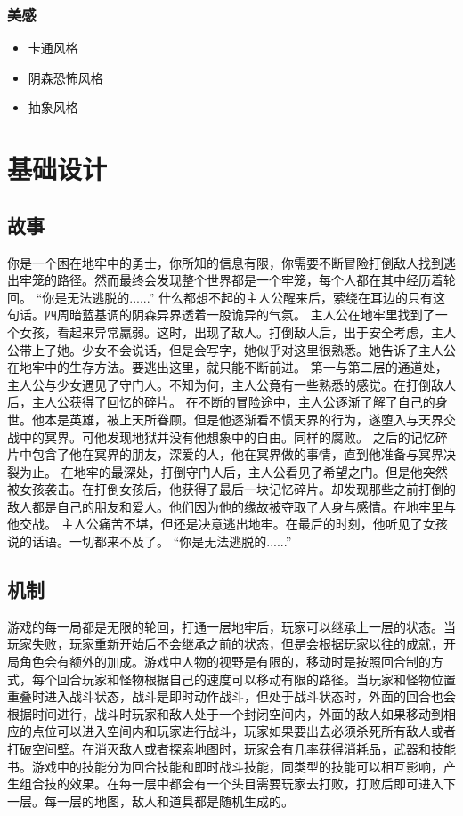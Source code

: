 \documentclass{article}
\begin{document}
\subsubsection{美感}
\begin{itemize}
	\item 卡通风格
	\item 阴森恐怖风格
	\item 抽象风格
\end{itemize}

\section{基础设计}
\subsection{故事}
你是一个困在地牢中的勇士，你所知的信息有限，你需要不断冒险打倒敌人找到逃出牢笼的路径。然而最终会发现整个世界都是一个牢笼，每个人都在其中经历着轮回。
“你是无法逃脱的......”
什么都想不起的主人公醒来后，萦绕在耳边的只有这句话。四周暗蓝基调的阴森异界透着一股诡异的气氛。
主人公在地牢里找到了一个女孩，看起来异常羸弱。这时，出现了敌人。打倒敌人后，出于安全考虑，主人公带上了她。少女不会说话，但是会写字，她似乎对这里很熟悉。她告诉了主人公在地牢中的生存方法。要逃出这里，就只能不断前进。
第一与第二层的通道处，主人公与少女遇见了守门人。不知为何，主人公竟有一些熟悉的感觉。在打倒敌人后，主人公获得了回忆的碎片。
在不断的冒险途中，主人公逐渐了解了自己的身世。他本是英雄，被上天所眷顾。但是他逐渐看不惯天界的行为，遂堕入与天界交战中的冥界。可他发现地狱并没有他想象中的自由。同样的腐败。
之后的记忆碎片中包含了他在冥界的朋友，深爱的人，他在冥界做的事情，直到他准备与冥界决裂为止。
在地牢的最深处，打倒守门人后，主人公看见了希望之门。但是他突然被女孩袭击。在打倒女孩后，他获得了最后一块记忆碎片。却发现那些之前打倒的敌人都是自己的朋友和爱人。他们因为他的缘故被夺取了人身与感情。在地牢里与他交战。
主人公痛苦不堪，但还是决意逃出地牢。在最后的时刻，他听见了女孩说的话语。一切都来不及了。
“你是无法逃脱的......”
\subsection{机制}
游戏的每一局都是无限的轮回，打通一层地牢后，玩家可以继承上一层的状态。当玩家失败，玩家重新开始后不会继承之前的状态，但是会根据玩家以往的成就，开局角色会有额外的加成。游戏中人物的视野是有限的，移动时是按照回合制的方式，每个回合玩家和怪物根据自己的速度可以移动有限的路径。当玩家和怪物位置重叠时进入战斗状态，战斗是即时动作战斗，但处于战斗状态时，外面的回合也会根据时间进行，战斗时玩家和敌人处于一个封闭空间内，外面的敌人如果移动到相应的点位可以进入空间内和玩家进行战斗，玩家如果要出去必须杀死所有敌人或者打破空间壁。在消灭敌人或者探索地图时，玩家会有几率获得消耗品，武器和技能书。游戏中的技能分为回合技能和即时战斗技能，同类型的技能可以相互影响，产生组合技的效果。在每一层中都会有一个头目需要玩家去打败，打败后即可进入下一层。每一层的地图，敌人和道具都是随机生成的。
\end{document}
